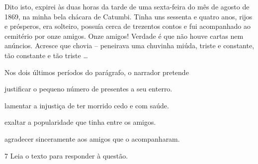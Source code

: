 
\begin{myquote}

Dito isto, expirei às duas horas da tarde de uma
sexta-feira do mês de agosto de 1869, na minha bela
chácara de Catumbi. Tinha uns sessenta e quatro anos,
rijos e prósperos, era solteiro, possuía cerca de trezentos
contos e fui acompanhado ao cemitério por onze amigos.
Onze amigos! Verdade é que não houve cartas nem
anúncios. Acresce que chovia -- peneirava uma chuvinha
miúda, triste e constante, tão constante e tão triste \ldots{}


\end{myquote}

Nos dois últimos períodos do parágrafo, o narrador pretende 

\begin{escolha}

    \item justificar o pequeno número de presentes a seu enterro. 

    \item lamentar a injustiça de ter morrido cedo e com saúde.

    \item exaltar a popularidade que tinha entre os amigos.

    \item agradecer sinceramente aos amigos que o acompanharam.

\end{escolha}

\num{7} Leia o texto para responder à questão. 

